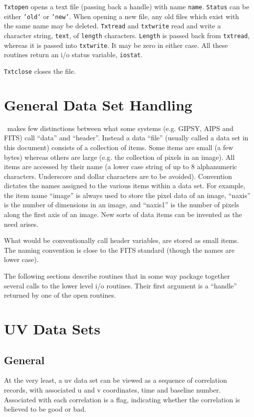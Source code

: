 \documentclass{report}
\begin{document}
{\tt Txtopen} opens a text file (passing back a handle) with name {\tt name}.
{\tt Status} can be either {\tt 'old'} or {\tt 'new'}. When opening a new
file, any old files which exist with the same name may be deleted.
{\tt Txtread} and {\tt txtwrite} read and write a character string, {\tt text},
of {\tt length} characters. {\tt Length} is passed back from {\tt txtread},
whereas it is passed into {\tt txtwrite}. It may be zero in either case.
All these routines return an i/o status variable, {\tt iostat}.

{\tt Txtclose} closes the file.

\section{General Data Set Handling}
\miriad\ makes few distinctions between what some systems (e.g. GIPSY,
AIPS and FITS) call ``data'' and ``header''.
Instead a data ``file'' (usually called a data set in this
document) consists of a collection of items. Some
items are small (a few bytes) whereas others are large (e.g. the collection
of pixels in an image). All items are accessed by their name (a lower case
string of up to 8 alphanumeric characters. Underscore and dollar
characters are to be avoided). Convention dictates the names
assigned to the various items within a data set. For example, the
item name ``image'' is always used to store the pixel data of an image,
``naxis'' is the number of dimensions in an image, and ``naxis1'' is
the number of pixels along the first axis of an image. New
sorts of data items can be invented as the need arises.

What would be conventionally call header variables, are stored as small items.
The naming convention is close to the FITS standard (though the names are
lower case).

The following sections describe routines that in some way package together
several calls to the lower level i/o routines. Their first argument is
a ``handle'' returned by one of the open routines.

\section{UV Data Sets}
\subsection{General}
At the very least, a uv data set can be viewed as a sequence of
correlation
records, with associated u and v coordinates, time and baseline number.
Associated with each correlation is a flag, indicating whether the
correlation is believed to be good or bad.
\end{document}
